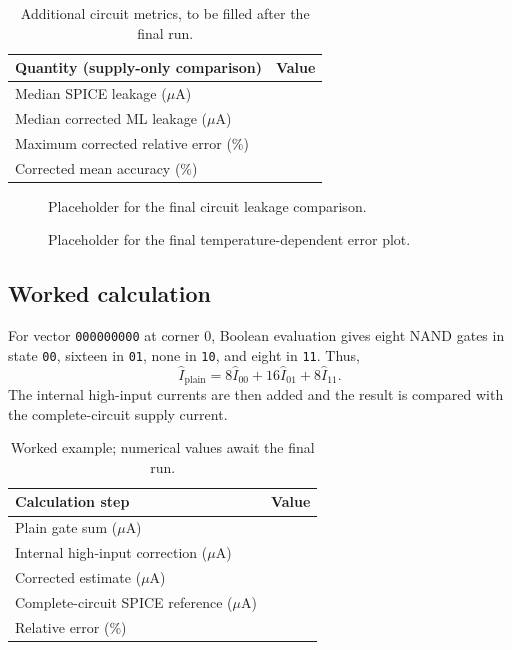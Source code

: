 \begin{table}[H]
\centering
\begin{tabular}{lr}
\toprule
Quantity (supply-only comparison) & Value\\
\midrule
Median SPICE leakage ($\mu$A) & \\
Median corrected ML leakage ($\mu$A) & \\
Maximum corrected relative error (\%) & \\
Corrected mean accuracy (\%) & \\
\bottomrule
\end{tabular}
\caption{Additional circuit metrics, to be filled after the final run.}
\end{table}

\begin{figure}[H]
\centering
{}
\caption{Placeholder for the final circuit leakage comparison.}
\label{fig:circuitparity}
\end{figure}

\begin{figure}[H]
\centering
{}
\caption{Placeholder for the final temperature-dependent error plot.}
\label{fig:circuittemperature}
\end{figure}

\subsection{Worked calculation}
For vector \texttt{000000000} at corner 0, Boolean evaluation gives eight
NAND gates in state \texttt{00}, sixteen in \texttt{01}, none in
\texttt{10}, and eight in \texttt{11}. Thus,
\begin{equation}
\widehat I_{\mathrm{plain}}=
8\widehat I_{00}+16\widehat I_{01}+8\widehat I_{11}.
\end{equation}
The internal high-input currents are then added and the result is compared
with the complete-circuit supply current.
\begin{table}[H]
\centering
\begin{tabular}{lr}
\toprule
Calculation step & Value\\
\midrule
Plain gate sum ($\mu$A) & \\
Internal high-input correction ($\mu$A) & \\
Corrected estimate ($\mu$A) & \\
Complete-circuit SPICE reference ($\mu$A) & \\
Relative error (\%) & \\
\bottomrule
\end{tabular}
\caption{Worked example; numerical values await the final run.}
\end{table}

